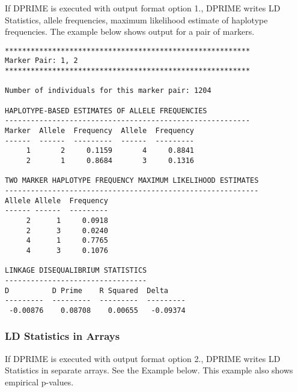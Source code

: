 If DPRIME is executed with output format option 1., DPRIME writes LD Statistics,
allele frequencies, maximum likelihood estimate of haplotype frequencies.  The
example below shows output for a pair of markers.

\begin{verbatim}
*********************************************************
Marker Pair: 1, 2
*********************************************************

Number of individuals for this marker pair: 1204

HAPLOTYPE-BASED ESTIMATES OF ALLELE FREQUENCIES 
---------------------------------------------------------
Marker  Allele  Frequency  Allele  Frequency
------  ------  ---------  ------  ---------
     1       2     0.1159       4     0.8841
     2       1     0.8684       3     0.1316

TWO MARKER HAPLOTYPE FREQUENCY MAXIMUM LIKELIHOOD ESTIMATES
-----------------------------------------------------------
Allele Allele  Frequency
------ ------  ---------
     2      1     0.0918
     2      3     0.0240
     4      1     0.7765
     4      3     0.1076

LINKAGE DISEQUALIBRIUM STATISTICS
---------------------------------
D          D Prime    R Squared  Delta
---------  ---------  ---------  ---------
 -0.00876    0.08708    0.00655   -0.09374
\end{verbatim}

\subsubsection{LD Statistics in Arrays}

If DPRIME is executed with output format option 2., DPRIME writes LD Statistics
in separate arrays.  See the Example below.  This example also shows empirical
p-values.

